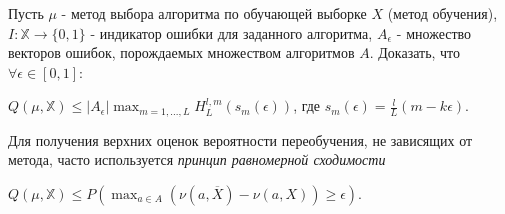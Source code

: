 \begin{problem} Пусть $\mu$ - метод выбора алгоритма по обучающей выборке $X$ (метод обучения), $I: \mathbb{X} \rightarrow \{0, 1\}$ - индикатор ошибки для заданного алгоритма, $A_{\epsilon}$ - множество векторов ошибок, порождаемых множеством алгоритмов $A$. Доказать, что $\forall \epsilon \in [0, 1]$:
\begin{center}
$Q(\mu, \mathbb{X}) \leq |A_{\epsilon}| \max_{m = 1,...,L} H_L^{l,m}(s_m(\epsilon))$, где $s_m(\epsilon) = \frac{l}{L}(m - k\epsilon)$.
\end{center}

\begin{ordre}
Для получения верхних оценок вероятности переобучения, не зависящих от метода, часто используется \textit{принцип равномерной сходимости}
\begin{center}
$Q(\mu, \mathbb{X}) \leq P( \max_{a \in A} ( \nu (a, \overline{X}) - \nu (a,X) )\geq \epsilon)$.
\end{center}
\end{ordre}
\end{problem}


